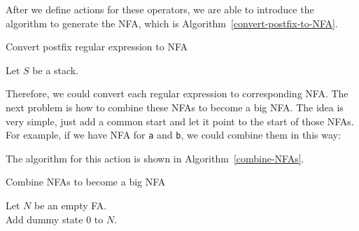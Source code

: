 \documentclass{article}
\begin{document}
After we define actions for these operators, we are able to introduce the algorithm to generate the NFA, which is Algorithm~\ref{convert-postfix-to-NFA}.

\begin{algorithm}
    \caption{Convert postfix regular expression to NFA}
    \label{convert-postfix-to-NFA}
    Let $S$ be a stack.\\
\end{algorithm}

Therefore, we could convert each regular expression to corresponding NFA. The next problem is how to combine these NFAs to become a big NFA. The idea is very simple, just add a common start and let it point to the start of those NFAs. For example, if we have NFA for \texttt{a} and \texttt{b}, we could combine them in this way:

\begin{center}
\end{center}

The algorithm for this action is shown in Algorithm~\ref{combine-NFAs}.

\begin{algorithm}
    \caption{Combine NFAs to become a big NFA}
    \label{combine-NFAs}
    Let $N$ be an empty FA.\\
    Add dummy state 0 to $N$.\\
\end{algorithm}
\end{document}
